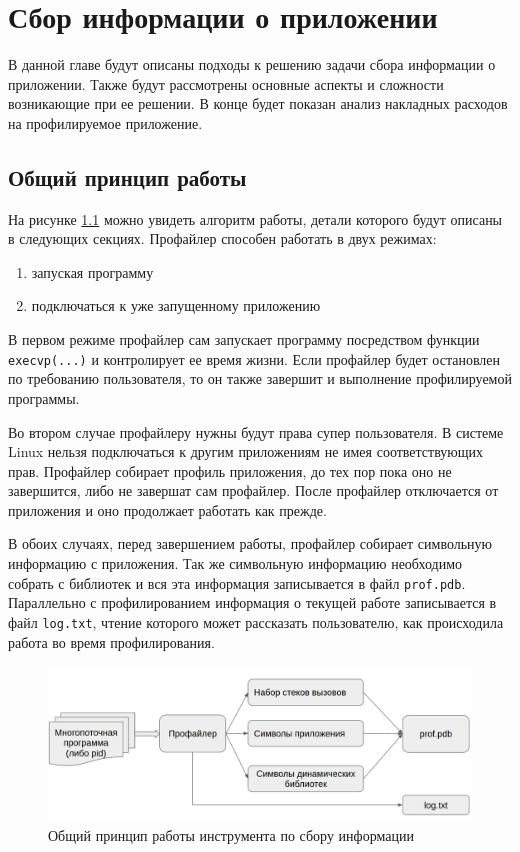 \chapter{Сбор информации о приложении}
	В данной главе будут описаны подходы к решению задачи сбора информации о приложении. Также будут рассмотрены основные аспекты и сложности возникающие при ее решении. В конце будет показан анализ накладных расходов на профилируемое приложение. 

\section{Общий принцип работы}
	На рисунке \ref{fig:general_profiler} можно увидеть алгоритм работы, детали которого будут описаны в следующих секциях. Профайлер способен работать в двух режимах: 

\begin{enumerate}
	\item запуская программу
    \item подключаться к уже запущенному приложению
\end{enumerate}

	В первом режиме профайлер сам запускает программу посредством функции \verb|execvp(...)| и контролирует ее время жизни. Если профайлер будет остановлен по требованию пользователя, то он также завершит и выполнение профилируемой программы.
    
    Во втором случае профайлеру нужны будут права супер пользователя. В системе Linux нельзя подключаться к другим приложениям не имея соответствующих прав. Профайлер собирает профиль приложения, до тех пор пока оно не завершится, либо не завершат сам профайлер. После профайлер отключается от приложения и оно продолжает работать как прежде.
    
    В обоих случаях, перед завершением работы, профайлер собирает символьную информацию с приложения. Так же символьную информацию необходимо собрать с библиотек и вся эта информация записывается в файл \verb|prof.pdb|. Параллельно с профилированием информация о текущей работе записывается в файл \verb|log.txt|, чтение которого может рассказать пользователю, как происходила работа во время профилирования.
    
    \begin{figure}[H]
        \caption{Общий принцип работы инструмента по сбору информации}
        \label{fig:general_profiler}
        \centering
        \includegraphics[width=\linewidth]{images/general_profiler}
    \end{figure}    
    
